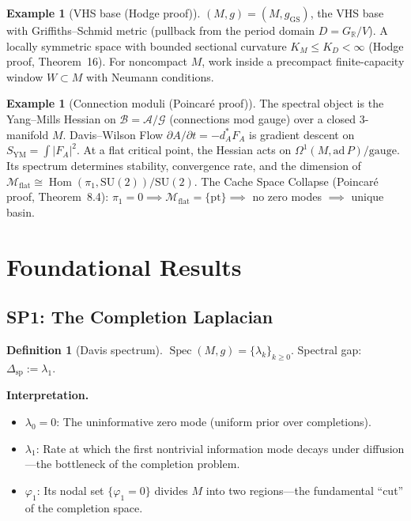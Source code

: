 \documentclass[11pt]{article}
\theoremstyle{definition}
\newtheorem{definition}[theorem]{Definition}
\newtheorem{example}[theorem]{Example}
\theoremstyle{remark}
\newcommand{\Spec}{\operatorname{Spec}}
\newcommand{\Hom}{\operatorname{Hom}}
\newcommand{\Mflat}{\mathcal{M}_{\mathrm{flat}}}
\newcommand{\SYM}{S_{\mathrm{YM}}}
\begin{document}
\begin{example}[VHS base (Hodge proof)]
$(M, g) = (M, g_{\mathrm{GS}})$, the VHS base with Griffiths--Schmid metric (pullback from the period domain $D = G_\mathbb{R}/V$). A locally symmetric space with bounded sectional curvature $K_M \le K_D < \infty$ (Hodge proof, Theorem~16). For noncompact $M$, work inside a precompact finite-capacity window $W \subset M$ with Neumann conditions.
\end{example}

\begin{example}[Connection moduli (Poincar\'{e} proof)]
The spectral object is the Yang--Mills Hessian on $\mathcal{B} = \mathcal{A}/\mathcal{G}$ (connections mod gauge) over a closed 3-manifold $M$. Davis--Wilson Flow $\partial A/\partial t = -d_A^* F_A$ is gradient descent on $\SYM = \int|F_A|^2$. At a flat critical point, the Hessian acts on $\Omega^1(M, \mathrm{ad}\,P)/\mathrm{gauge}$. Its spectrum determines stability, convergence rate, and the dimension of $\Mflat \cong \Hom(\pi_1, \mathrm{SU}(2))/\mathrm{SU}(2)$. The Cache Space Collapse (Poincar\'{e} proof, Theorem~8.4): $\pi_1 = 0 \implies \Mflat = \{\mathrm{pt}\} \implies$ no zero modes $\implies$ unique basin.
\end{example}


\section{Foundational Results}
\label{sec:foundational}

\subsection{SP1: The Completion Laplacian}

\begin{definition}[Davis spectrum]
$\Spec(M,g) = \{\lambda_k\}_{k \ge 0}$. Spectral gap: $\Delta_{\mathrm{sp}} := \lambda_1$.
\end{definition}

\textbf{Interpretation.}
\begin{itemize}[nosep]
\item $\lambda_0 = 0$: The uninformative zero mode (uniform prior over completions).
\item $\lambda_1$: Rate at which the first nontrivial information mode decays under diffusion---the bottleneck of the completion problem.
\item $\varphi_1$: Its nodal set $\{\varphi_1 = 0\}$ divides $M$ into two regions---the fundamental ``cut'' of the completion space.
\end{itemize}
\end{document}
